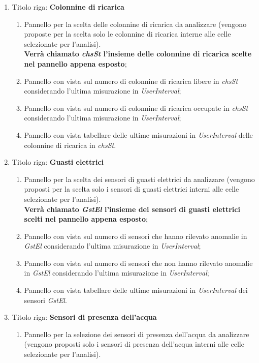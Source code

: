 \begin{enumerate}
\item Titolo riga: \textbf{Colonnine di ricarica}
\begin{enumerate}
    \item Pannello per la scelta delle colonnine di ricarica da analizzare (vengono proposte per la scelta solo le  colonnine di ricarica interne alle celle selezionate per l'analisi).\\
    \textbf{Verrà chiamato \textit{chsSt} l'insieme delle  colonnine di ricarica scelte nel pannello appena esposto};
    \item Pannello con vista sul numero di colonnine di ricarica libere in \textit{chsSt} considerando l'ultima misurazione in
    \textit{UserInterval};
    \item Pannello con vista sul numero di colonnine di ricarica occupate in \textit{chsSt} considerando l'ultima misurazione in \textit{UserInterval};
    \item Pannello con vista tabellare delle ultime misurazioni in \textit{UserInterval} delle colonnine di ricarica in \textit{chsSt}.
\end{enumerate}
\item Titolo riga: \textbf{Guasti elettrici}
\begin{enumerate}
    \item Pannello per la scelta dei sensori di guasti elettrici da analizzare (vengono proposti per la scelta solo i sensori di guasti elettrici interni alle celle selezionate per l'analisi).\\
    \textbf{Verrà chiamato \textit{GstEl} l'insieme dei sensori di guasti elettrici scelti nel pannello appena esposto};
    \item Pannello con vista sul numero di sensori che hanno rilevato anomalie in \textit{GstEl} considerando l'ultima misurazione in \textit{UserInterval};
    \item Pannello con vista sul numero di sensori che non hanno rilevato anomalie in \textit{GstEl} considerando l'ultima misurazione in \textit{UserInterval};
    \item Pannello con vista tabellare delle ultime misurazioni in \textit{UserInterval} dei sensori \textit{GstEl}.
\end{enumerate}
\item Titolo riga: \textbf{Sensori di presenza dell'acqua}
\begin{enumerate}
    \item Pannello per la selezione dei sensori di presenza dell'acqua da analizzare (vengono proposti solo i sensori di presenza dell'acqua interni alle celle selezionate per l'analisi).\\

\end{enumerate}
\end{enumerate}
